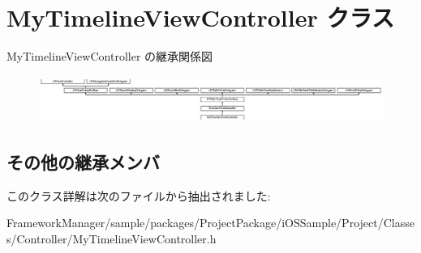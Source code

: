 \hypertarget{interface_my_timeline_view_controller}{}\section{My\+Timeline\+View\+Controller クラス}
\label{interface_my_timeline_view_controller}
My\+Timeline\+View\+Controller の継承関係図\begin{figure}[H]
\begin{center}
\leavevmode
\includegraphics[height=1.535088cm]{interface_my_timeline_view_controller}
\end{center}
\end{figure}
\subsection*{その他の継承メンバ}


このクラス詳解は次のファイルから抽出されました\+:\begin{DoxyCompactItemize}
\item 
Framework\+Manager/sample/packages/\+Project\+Package/i\+O\+S\+Sample/\+Project/\+Classes/\+Controller/My\+Timeline\+View\+Controller.\+h\end{DoxyCompactItemize}
